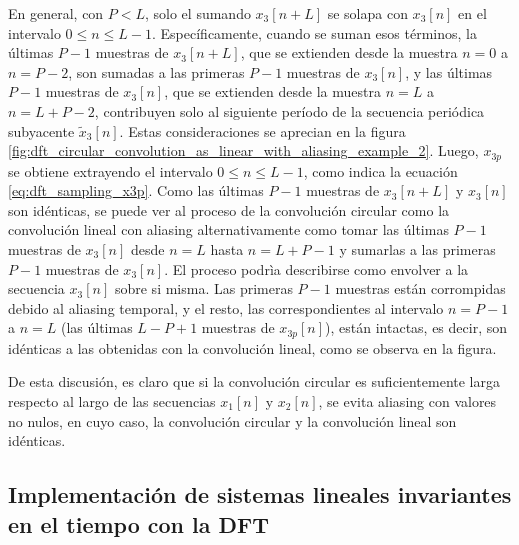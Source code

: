 \documentclass[a4paper]{report}
\begin{document}
En general, con \(P<L\), solo el sumando \(x_3[n+L]\) se solapa con \(x_3[n]\) en el intervalo \(0\leq n\leq L-1\). Específicamente, cuando se suman esos términos, la últimas \(P-1\) muestras de \(x_3[n+L]\), que se extienden desde la muestra \(n=0\) a \(n=P-2\), son sumadas a las primeras \(P-1\) muestras de \(x_3[n]\), y las últimas \(P-1\) muestras de \(x_3[n]\), que se extienden desde la muestra \(n=L\) a \(n=L+P-2\), contribuyen solo al siguiente período de la secuencia periódica subyacente \(\tilde{x}_3[n]\). Estas consideraciones se aprecian en la figura \ref{fig:dft_circular_convolution_as_linear_with_aliasing_example_2}. Luego, \(x_{3p}\) se obtiene extrayendo el intervalo \(0\leq n\leq L-1\), como indica la ecuación \ref{eq:dft_sampling_x3p}. Como las últimas \(P-1\) muestras de \(x_3[n+L]\) y \(x_3[n]\) son idénticas, se puede ver al proceso de la convolución circular como la convolución lineal con aliasing alternativamente como tomar las últimas \(P-1\) muestras de \(x_3[n]\) desde \(n=L\) hasta \(n=L+P-1\) y sumarlas a las primeras \(P-1\) muestras de \(x_3[n]\). El proceso podrìa describirse como envolver a la secuencia \(x_3[n]\) sobre si misma. Las primeras \(P-1\) muestras están corrompidas debido al aliasing temporal, y el resto, las correspondientes al intervalo \(n=P-1\) a \(n=L\) (las últimas \(L-P+1\) muestras de \(x_{3p}[n]\)), están intactas, es decir, son idénticas a las obtenidas con la convolución lineal, como se observa en la figura.

De esta discusión, es claro que si la convolución circular es suficientemente larga respecto al largo de las secuencias \(x_1[n]\) y \(x_2[n]\), se evita aliasing con valores no nulos, en cuyo caso, la convolución circular y la convolución lineal son idénticas.

\subsection{Implementación de sistemas lineales invariantes en el tiempo con la DFT}
\end{document}
